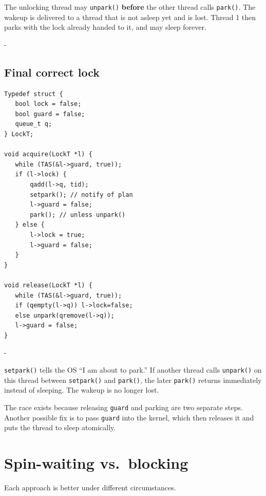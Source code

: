 \documentclass[11pt,a4paper]{article}
\makeatletter
\newcommand{\keepspace}[1]{\par\penalty-100\begingroup
  \setlength{\dimen@}{#1}\dimen@ii\pagegoal\advance\dimen@ii-\pagetotal
  \ifdim\dimen@>\dimen@ii\ifdim\dimen@ii>\z@\vfil\fi\break\fi\endgroup}
\makeatother
\begin{document}
\begin{warnbox}
The unlocking thread may \texttt{unpark()} \textbf{before} the other thread
calls \texttt{park()}. The wakeup is delivered to a thread that is not
asleep yet and is lost. Thread 1 then parks with the lock already handed to
it, and may sleep forever.
\end{warnbox}

\keepspace{27\baselineskip}
\subsection{Final correct lock}

\begin{lstlisting}
Typedef struct {
   bool lock = false;
   bool guard = false;
   queue_t q;
} LockT;

void acquire(LockT *l) {
   while (TAS(&l->guard, true));
   if (l->lock) {
       qadd(l->q, tid);
       setpark(); // notify of plan
       l->guard = false;
       park(); // unless unpark()
   } else {
       l->lock = true;
       l->guard = false;
   }
}

void release(LockT *l) {
   while (TAS(&l->guard, true));
   if (qempty(l->q)) l->lock=false;
   else unpark(qremove(l->q));
   l->guard = false;
}
\end{lstlisting}

\keepspace{8\baselineskip}
\begin{keybox}
\texttt{setpark()} tells the OS ``I am about to park.'' If another thread
calls \texttt{unpark()} on this thread between \texttt{setpark()} and
\texttt{park()}, the later \texttt{park()} returns immediately instead of
sleeping. The wakeup is no longer lost.

The race exists because releasing \texttt{guard} and parking are two
separate steps. Another possible fix is to pass \texttt{guard} into the
kernel, which then releases it and puts the thread to sleep atomically.
\end{keybox}

\section{Spin-waiting vs.\ blocking}

Each approach is better under different circumstances.
\end{document}
